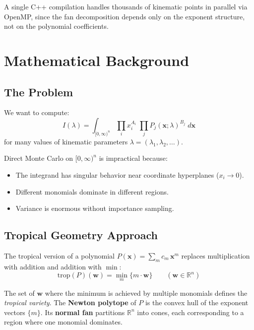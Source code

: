 \documentclass[11pt,a4paper]{article}
\begin{document}
A single C++ compilation handles thousands of kinematic points in parallel via OpenMP, since the fan decomposition depends only on the exponent structure, not on the polynomial coefficients.

\section{Mathematical Background}

\subsection{The Problem}

We want to compute:
\begin{equation}
I(\lambda) = \int_{[0,\infty)^n} \prod_i x_i^{A_i} \;\prod_j P_j(\mathbf{x};\lambda)^{B_j} \; d\mathbf{x}
\end{equation}
for many values of kinematic parameters $\lambda = (\lambda_1, \lambda_2, \ldots)$.

Direct Monte Carlo on $[0,\infty)^n$ is impractical because:
\begin{itemize}
  \item The integrand has singular behavior near coordinate hyperplanes ($x_i \to 0$).
  \item Different monomials dominate in different regions.
  \item Variance is enormous without importance sampling.
\end{itemize}

\subsection{Tropical Geometry Approach}

The tropical version of a polynomial $P(\mathbf{x}) = \sum_m c_m \, \mathbf{x}^m$ replaces multiplication with addition and addition with $\min$:
\begin{equation}
\mathrm{trop}(P)(\mathbf{w}) = \min_m \{ m \cdot \mathbf{w} \} \qquad (\mathbf{w} \in \mathbb{R}^n)
\end{equation}

The set of $\mathbf{w}$ where the minimum is achieved by multiple monomials defines the \textit{tropical variety}. The \textbf{Newton polytope} of $P$ is the convex hull of the exponent vectors $\{m\}$. Its \textbf{normal fan} partitions $\mathbb{R}^n$ into cones, each corresponding to a region where one monomial dominates.
\end{document}
